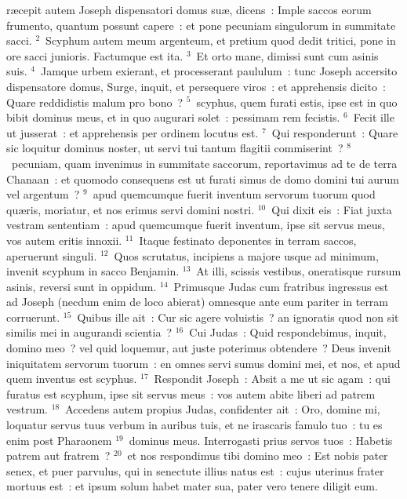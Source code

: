 \bchapter
{}r\ae cepit autem Joseph dispensatori domus su\ae , dicens~: Imple saccos eorum frumento, quantum possunt capere~: et pone pecuniam singulorum in summitate sacci.
${}^{2}$~Scyphum autem meum argenteum, et pretium quod dedit tritici, pone in ore sacci junioris. Factumque est ita.
${}^{3}$~Et orto mane, dimissi sunt cum asinis suis.
${}^{4}$~Jamque urbem exierant, et processerant paululum~: tunc Joseph accersito dispensatore domus, Surge, inquit, et persequere viros~: et apprehensis dicito~: Quare reddidistis malum pro bono~?
${}^{5}$~scyphus, quem furati estis, ipse est in quo bibit dominus meus, et in quo augurari solet~: pessimam rem fecistis.
${}^{6}$~Fecit ille ut jusserat~: et apprehensis per ordinem locutus est.
${}^{7}$~Qui responderunt~: Quare sic loquitur dominus noster, ut servi tui tantum flagitii commiserint~?
${}^{8}$~pecuniam, quam invenimus in summitate saccorum, reportavimus ad te de terra Chanaan~: et quomodo consequens est ut furati simus de domo domini tui aurum vel argentum~?
${}^{9}$~apud quemcumque fuerit inventum servorum tuorum quod qu\ae ris, moriatur, et nos erimus servi domini nostri.
${}^{10}$~Qui dixit eis~: Fiat juxta vestram sententiam~: apud quemcumque fuerit inventum, ipse sit servus meus, vos autem eritis innoxii.
${}^{11}$~Itaque festinato deponentes in terram saccos, aperuerunt singuli.
${}^{12}$~Quos scrutatus, incipiens a majore usque ad minimum, invenit scyphum in sacco Benjamin.
${}^{13}$~At illi, scissis vestibus, oneratisque rursum asinis, reversi sunt in oppidum.
${}^{14}$~Primusque Judas cum fratribus ingressus est ad Joseph (necdum enim de loco abierat) omnesque ante eum pariter in terram corruerunt.
${}^{15}$~Quibus ille ait~: Cur sic agere voluistis~? an ignoratis quod non sit similis mei in augurandi scientia~?
${}^{16}$~Cui Judas~: Quid respondebimus, inquit, domino meo~? vel quid loquemur, aut juste poterimus obtendere~? Deus invenit iniquitatem servorum tuorum~: en omnes servi sumus domini mei, et nos, et apud quem inventus est scyphus.
${}^{17}$~Respondit Joseph~: Absit a me ut sic agam~: qui furatus est scyphum, ipse sit servus meus~: vos autem abite liberi ad patrem vestrum.
${}^{18}$~Accedens autem propius Judas, confidenter ait~: Oro, domine mi, loquatur servus tuus verbum in auribus tuis, et ne irascaris famulo tuo~: tu es enim post Pharaonem
${}^{19}$~dominus meus. Interrogasti prius servos tuos~: Habetis patrem aut fratrem~?
${}^{20}$~et nos respondimus tibi domino meo~: Est nobis pater senex, et puer parvulus, qui in senectute illius natus est~: cujus uterinus frater mortuus est~: et ipsum solum habet mater sua, pater vero tenere diligit eum.
